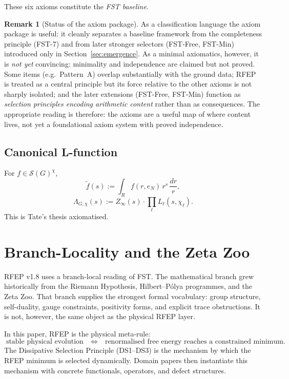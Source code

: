 \documentclass[11pt,a4paper]{article}
\theoremstyle{plain}
\theoremstyle{definition}
\newtheorem{remark}[theorem]{Remark}
\renewcommand{\S}{\mathcal{S}}
\newcommand{\chifn}{\chi}
\begin{document}
These six axioms constitute the \emph{FST baseline}.

\begin{remark}[Status of the axiom package]
\label{rem:axioms-status}
As a classification language the axiom package is useful: it
cleanly separates a baseline framework from the completeness
principle (FST-7) and from later stronger selectors (FST-Free,
FST-Min) introduced only in Section~\ref{sec:emergence}.  As a
minimal axiomatics, however, it is \emph{not yet} convincing:
minimality and independence are claimed but not proved.  Some items
(e.g.\ Pattern~A) overlap substantially with the ground data; RFEP
is treated as a central principle but its force relative to the
other axioms is not sharply isolated; and the later extensions
(FST-Free, FST-Min) function as \emph{selection principles encoding
arithmetic content} rather than as consequences.  The appropriate
reading is therefore: the axioms are a useful map of where
content lives, not yet a foundational axiom system with proved
independence.
\end{remark}

\subsection{Canonical L-function}

For $f \in \S(G)^\chifn$,
\[
  \tilde f(s) := \int_R f(r, e_N) \, r^s \, \frac{dr}{r},
\]
\[
  \Lambda_{G,\chifn}(s) := Z_\infty(s) \cdot \prod_\ell
    L_\ell(s, \chifn_\ell).
\]
This is Tate's thesis \cite{Tate1950} axiomatised.

\section{Branch-Locality and the Zeta Zoo}
\label{sec:branch-locality}

RFEP v1.8 uses a branch-local reading of FST.  The mathematical
branch grew historically from the Riemann Hypothesis, Hilbert--P\'olya
programmes, and the Zeta Zoo.  That branch supplies the strongest
formal vocabulary: group structure, self-duality, gauge constraints,
positivity forms, and explicit trace obstructions.  It is not,
however, the same object as the physical RFEP layer.

In this paper, RFEP is the physical meta-rule:
\[
  \text{stable physical evolution}
  \quad\Longleftrightarrow\quad
  \text{renormalised free energy reaches a constrained minimum.}
\]
The Dissipative Selection Principle (DS1--DS3) is the mechanism by
which the RFEP minimum is selected dynamically.  Domain papers then
instantiate this mechanism with concrete functionals, operators, and
defect structures.
\end{document}
